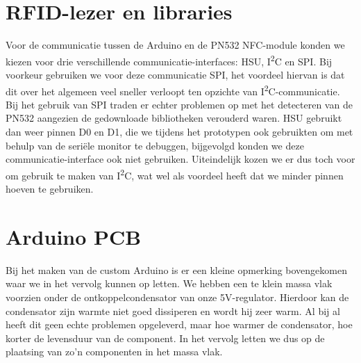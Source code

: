 \section{RFID-lezer en libraries}
Voor de communicatie tussen de Arduino en de PN532 NFC-module konden we kiezen voor drie verschillende communicatie-interfaces: HSU, I\textsuperscript{2}C en SPI.
Bij voorkeur gebruiken we voor deze communicatie SPI, het voordeel hiervan is dat dit over het algemeen veel sneller verloopt ten opzichte van I\textsuperscript{2}C-communicatie. Bij het gebruik van SPI traden er echter problemen op met het detecteren van de PN532 aangezien de gedownloade bibliotheken verouderd waren.
HSU gebruikt dan weer pinnen D0 en D1, die we tijdens het prototypen ook gebruikten om met behulp van de seri\"ele monitor te debuggen, bijgevolgd konden we deze communicatie-interface ook niet gebruiken. Uiteindelijk kozen we er dus toch voor om gebruik te maken van I\textsuperscript{2}C, wat wel als voordeel heeft dat we minder pinnen hoeven te gebruiken.
\section{Arduino PCB}
Bij het maken van de custom Arduino is er een kleine opmerking bovengekomen waar we in het vervolg kunnen op letten. We hebben een te klein massa vlak voorzien onder de ontkoppelcondensator van onze 5V-regulator. Hierdoor kan de condensator zijn warmte niet goed dissiperen en wordt hij zeer warm. Al bij al heeft dit geen echte problemen opgeleverd, maar hoe warmer de condensator, hoe korter de levensduur van de component. In het vervolg letten we dus op de plaatsing van zo'n componenten in het massa vlak.